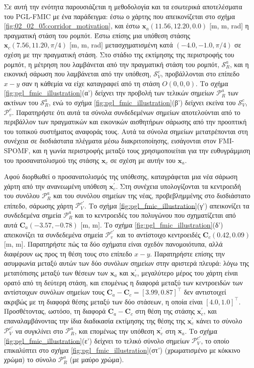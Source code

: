 Σε αυτή την ενότητα παρουσιάζεται η μεθοδολογία και τα εσωτερικά αποτελέσματα
του PGL-FMIC με ένα παράδειγμα: έστω ο χάρτης που απεικονίζεται στο σχήμα
\ref{fig:02_02_05:corridor_motivation}, και έστω $\bm{x}_a(11.56, 12.20, 0.0)$
[m, m, rad] η πραγματική στάση του ρομπότ. Έστω επίσης μια υπόθεση στάσης
$\bm{x}_c (7.56, 11.20, \pi/4)$ [m, m, rad] μετασχηματισμένη κατά $(-4.0, -1.0,
\pi/4)$ σε σχέση με την πραγματική στάση. Στο στάδιο της εκτίμησης της
περιστροφής του ρομπότ, η μέτρηση που λαμβάνεται από την πραγματική στάση του
ρομπότ, $\mathcal{S}_R^a$, και η εικονική σάρωση που λαμβάνεται από την
υπόθεση, $\mathcal{S}_V^c$, προβάλλονται στο επίπεδο $x-y$ σαν η κάθεμία να
είχε καταγραφεί από τη στάση $Ο(0,0,0)$. Το σχήμα
\ref{fig:pgl_fmic_illustration}(α') δείχνει την προβολή των τελικών σημείων
$\mathcal{P}_R^a$ των ακτίνων του $\mathcal{S}_R^a$, ενώ το σχήμα
\ref{fig:pgl_fmic_illustration}(β') δείχνει εκείνα του $\mathcal{S}_V^c$,
$\mathcal{P}_v^c$.  Παρατηρήστε ότι αυτά τα σύνολα συνδεδεμένων σημείων
αποτελούνται από το περιβάλλον των πραγματικών και εικονικών αισθητήρων σάρωσης
από την προοπτική του τοπικού συστήματος αναφοράς τους. Αυτά τα σύνολα σημείων
μετατρέπονται στη συνέχεια σε δισδιάστατα πλέγματα μέσω διακριτοποίησης,
εισάγονται στον FMI-SPOMF, και η γωνία περιστροφής μεταξύ τους
χρησιμοποιείται για την ευθυγράμμιση του προσανατολισμού της στάσης $\bm{x}_c$
σε σχέση με αυτήν του $\bm{x}_a$.

Αφού διορθωθεί ο προσανατολισμός της υπόθεσης, καταγράφεται μια νέα σάρωση
χάρτη από την ανανεωμένη υπόθεση $\bm{x}_c^\prime$. Στη συνέχεια υπολογίζονται
τα κεντροειδή του συνόλου $\mathcal{P}_R^a$ και του συνόλου σημείων της νέας,
προβεβλημμένης στο δισδιάστατο επίπεδο, σάρωσης χάρτη
$\mathcal{P}_V^{c\prime}$. Το σχήμα \ref{fig:pgl_fmic_illustration}(γ')
απεικονίζει τα συνδεδεμένα σημεία $\mathcal{P}_R^a$ και το κεντροειδές του
πολυγώνου που σχηματίζεται από αυτά $\bm{C}_a(-3.57, -0.78)$ [m, m]. Το σχήμα
\ref{fig:pgl_fmic_illustration}(δ') απεικονίζει τα συνδεδεμένα σημεία
$\mathcal{P}_v^{c\prime}$ και το αντίστοιχο κεντροειδές $\bm{C}_c(0.42, 0.09)$
[m, m]. Παρατηρήστε πώς τα δύο σχήματα είναι σχεδόν πανομοιότυπα, αλλά
διαφέρουν ως προς τη θέση τους στο επίπεδο $x-y$.  Παρατηρήστε επίσης την
ασυμφωνία μεταξύ αυτών των δύο συνόλων σημείων στην αριστερά πλευρά: λόγω της
μετατόπισης μεταξύ των θέσεων των $\bm{x}_a$ και $\bm{x}_c^\prime$, μεγαλύτερο
μέρος του χάρτη είναι ορατό από τη δεύτερη στάση, και επομένως η διαφορά μεταξύ
των κεντροειδών των αντίστοιχων συνόλων σημείων τους $\bm{C}_a - \bm{C}_c =
[3.99, 0.87]^\top$ δεν αντιστοιχεί ακριβώς με τη διαφορά θέσης μεταξύ των δύο
στάσεων, η οποία είναι $[4.0, 1.0]^\top$.  Προσθέτοντας, ωστόσο, τη διαφορά
$\bm{C}_a - \bm{C}_c$ στη θέση της στάσης $\bm{x}_c^\prime$, και
επαναλαμβάνοντας την ίδια διαδικασία εκτίμησης της θέσης της $\bm{x}_c^\prime$
κάνει το σύνολο $\mathcal{P}_V^{c\prime}$ να συγκλίνει στο $\mathcal{P}_R^a$,
και επομένως την υπόθεση $\bm{x}_c^{\prime}$ στη $\bm{x}_a$. Το σχήμα
\ref{fig:pgl_fmic_illustration}(ε') δείχνει το τελικό σύνολο σημείων
$\mathcal{P}_V^{c\prime}$, το οποίο επικαλύπτει στο σχήμα
\ref{fig:pgl_fmic_illustration}(στ') (χρωματισμένο με κόκκινο χρώμα) το σύνολο
$\mathcal{P}_R^a$ (με μαύρο χρώμα).


